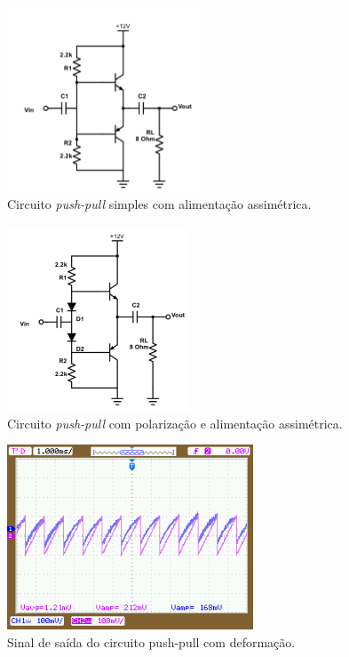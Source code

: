     \begin{figure}[h!]
        \centering
        \includegraphics[height=5.5cm]{imgSource/pushPullAssi.png}
        \caption{Circuito \emph{push-pull} simples com alimentação assimétrica.}
        \label{fig:pushAssi}
    \end{figure}
    
    \begin{figure}[h!]
        \centering
        \includegraphics[height=5.5cm]{imgSource/pushPullPol.png}
        \caption{Circuito \emph{push-pull} com polarização e alimentação assimétrica.}
        \label{fig:pushPol}
    \end{figure}
    
    \begin{figure}[h!]
        \centering
        \includegraphics[height=5.5cm]{imgSource/oscilloscope/NewFile0.png}
        \caption{Sinal de saída do circuito push-pull com deformação.}
        \label{fig:newFile0}
    \end{figure}
    

